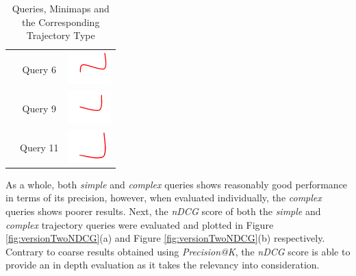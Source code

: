 \begin{table}[!ht]
\begin{tabular}{|c|c|c|}
 & Query 6 & \includegraphics{image/minimaps/query_06.png} \\ \cline{2-3}
 & Query 9 & \includegraphics{image/minimaps/query_09.png} \\ \cline{2-3}
 & Query 11 & \includegraphics{image/minimaps/query_11.png} \\ \hline
\end{tabular}
\caption{Queries, Minimaps and the Corresponding Trajectory Type}
\label{table:versionTwoComplexSimple}
\end{table}

As a whole, both \textit{simple} and \textit{complex} queries shows reasonably
good performance in terms of its precision, however, when evaluated
individually, the \textit{complex} queries shows poorer results. Next, the
\textit{nDCG} score of both the \textit{simple} and \textit{complex} trajectory
queries were evaluated and plotted in Figure \ref{fig:versionTwoNDCG}(a) and
Figure \ref{fig:versionTwoNDCG}(b) respectively. Contrary to coarse results
obtained using \textit{Precision@K}, the \textit{nDCG} score is able to provide
an in depth evaluation as it takes the relevancy into consideration.


